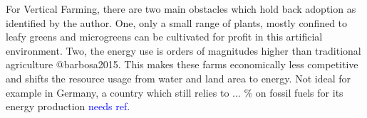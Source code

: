 For Vertical Farming, there are two main obstacles which hold back adoption as identified by the author.
One, only a small range of plants, mostly confined to leafy greens and microgreens can be cultivated for profit in this artificial environment.
Two, the energy use is orders of magnitudes higher than traditional agriculture @barbosa2015.
This makes these farms economically less competitive and shifts the resource usage from water and land area to energy.
Not ideal for example in Germany, a country which still relies to ... \% on fossil fuels for its energy production \textcolor{blue}{needs ref}.









